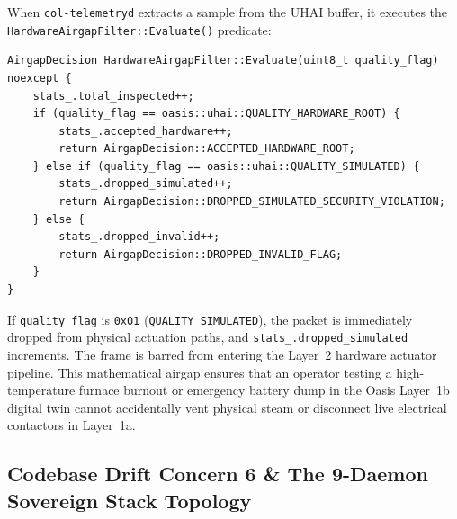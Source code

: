 When \texttt{col-telemetryd} extracts a sample from the UHAI buffer, it executes the \texttt{HardwareAirgapFilter::Evaluate()} predicate:
\begin{verbatim}
AirgapDecision HardwareAirgapFilter::Evaluate(uint8_t quality_flag) noexcept {
    stats_.total_inspected++;
    if (quality_flag == oasis::uhai::QUALITY_HARDWARE_ROOT) {
        stats_.accepted_hardware++;
        return AirgapDecision::ACCEPTED_HARDWARE_ROOT;
    } else if (quality_flag == oasis::uhai::QUALITY_SIMULATED) {
        stats_.dropped_simulated++;
        return AirgapDecision::DROPPED_SIMULATED_SECURITY_VIOLATION;
    } else {
        stats_.dropped_invalid++;
        return AirgapDecision::DROPPED_INVALID_FLAG;
    }
}
\end{verbatim}

If \texttt{quality\_flag} is \texttt{0x01} (\texttt{QUALITY\_SIMULATED}), the packet is immediately dropped from physical actuation paths, and \texttt{stats\_.dropped\_simulated} increments. The frame is barred from entering the Layer~2 hardware actuator pipeline. This mathematical airgap ensures that an operator testing a high-temperature furnace burnout or emergency battery dump in the Oasis Layer~1b digital twin cannot accidentally vent physical steam or disconnect live electrical contactors in Layer~1a.

\subsection{Codebase Drift Concern 6 \& The 9-Daemon Sovereign Stack Topology}

